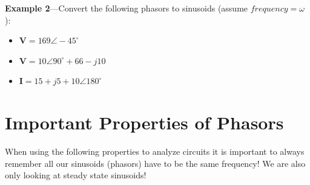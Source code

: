 \documentclass{handout}
\begin{document}


\textbf{Example 2}---Convert the following phasors to sinusoids (assume $frequency = \omega$):
\begin{itemize}
\item $\mathbf{V} = 169 \angle -45^\circ$
\item $\mathbf{V} = 10 \angle 90^\circ + 66 -j10$
\item $\mathbf{I} = 15+j5+10\angle180^\circ$
\end{itemize}



\newpage
\clearpage
\pagebreak

\section{Important Properties of Phasors}
When using the following properties to analyze circuits it is important to always remember all our sinusoids (phasors) have to be the same frequency!  We are also only looking at steady state sinusoids!
\end{document}
